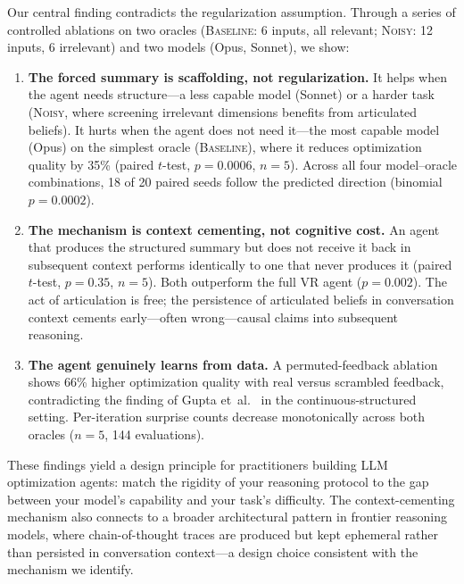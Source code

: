 \documentclass[11pt,letterpaper]{article}
\newcommand{\pval}[1]{\ensuremath{p = #1}}
\newcommand{\oracle}[1]{\textsc{#1}}
\newcommand{\baseline}{\oracle{Baseline}}
\newcommand{\noisy}{\oracle{Noisy}}
\begin{document}
Our central finding contradicts the regularization assumption. Through a
series of controlled ablations on two oracles (\baseline{}: 6 inputs, all
relevant; \noisy{}: 12 inputs, 6 irrelevant) and two models (Opus,
Sonnet), we show:

\begin{enumerate}
  \item \textbf{The forced summary is scaffolding, not regularization.}
  It helps when the agent needs structure---a less capable model (Sonnet)
  or a harder task (\noisy{}, where screening irrelevant dimensions
  benefits from articulated beliefs). It hurts when the agent does not
  need it---the most capable model (Opus) on the simplest oracle
  (\baseline{}), where it reduces optimization quality by 35\% (paired
  $t$-test, \pval{0.0006}, $n = 5$). Across all four model--oracle
  combinations, 18 of 20 paired seeds follow the predicted direction
  (binomial \pval{0.0002}).

  \item \textbf{The mechanism is context cementing, not cognitive cost.}
  An agent that produces the structured summary but does not receive it
  back in subsequent context performs identically to one that never
  produces it (paired $t$-test, \pval{0.35}, $n = 5$). Both outperform the
  full VR agent (\pval{0.002}). The act of articulation is free; the
  persistence of articulated beliefs in conversation context cements
  early---often wrong---causal claims into subsequent reasoning.

  \item \textbf{The agent genuinely learns from data.} A
  permuted-feedback ablation shows 66\% higher optimization quality with
  real versus scrambled feedback, contradicting the finding of Gupta
  et~al.\ \cite{gupta2025arewethereyet} in the continuous-structured
  setting. Per-iteration surprise counts decrease monotonically across
  both oracles ($n = 5$, 144 evaluations).
\end{enumerate}

These findings yield a design principle for practitioners building LLM
optimization agents: match the rigidity of your reasoning protocol to the
gap between your model's capability and your task's difficulty. The
context-cementing mechanism also connects to a broader architectural
pattern in frontier reasoning models, where chain-of-thought traces are
produced but kept ephemeral rather than persisted in conversation
context---a design choice consistent with the mechanism we identify.
\end{document}
